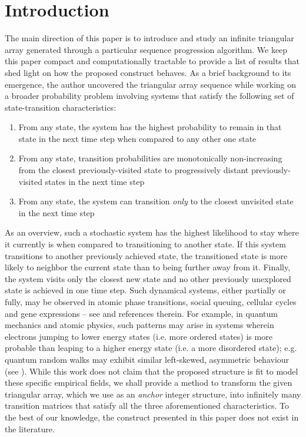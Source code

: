 \documentclass[a4paper,12pt]{article}
\begin{document}
\section{Introduction}
The main direction of this paper is to introduce and study an infinite triangular array generated through a particular sequence progression algorithm. We keep this paper compact and computationally tractable to provide a list of results that shed light on how the proposed construct behaves. As a brief background to its emergence, the author uncovered the triangular array sequence while working on a broader probability problem involving systems that satisfy the following set of state-transition characteristics:
\begin{enumerate}
\item From any state, the system has the highest probability to remain in that state in the next time step when compared to any other one state
\item From any state, transition probabilities are monotonically non-increasing from the closest previously-visited state to progressively distant previously-visited states in the next time step
\item From any state, the system can transition \emph{only} to the closest unvisited state in the next time step
\end{enumerate}
As an overview, such a stochastic system has the highest likelihood to stay where it currently is when compared to transitioning to another state. If this system transitions to another previously achieved state, the transitioned state is more likely to neighbor the current state than to being further away from it. Finally, the system visits only the closest new state and no other previously unexplored state is achieved in one time step. Such dynamical systems, either partially or fully, may be observed in atomic phase transitions, social queuing, cellular cycles and gene expressions -- see \cite{0app,3app,4app,5app,5app1,6app,6app1,7app} and references therein. For example, in quantum mechanics and atomic physics, such patterns may arise in systems wherein electrons jumping to lower energy states (i.e. more ordered states) is more probable than leaping to a higher energy state (i.e. a more disordered state); e.g. quantum random walks may exhibit similar left-skewed, asymmetric behaviour (see \cite{3q,7q}). While this work does not claim that the proposed structure is fit to model these specific empirical fields, we shall provide a method to transform the given triangular array, which we use as an \emph{anchor} integer structure, into infinitely many transition matrices that satisfy all the three aforementioned characteristics. To the best of our knowledge, the construct presented in this paper does not exist in the literature.
\end{document}
